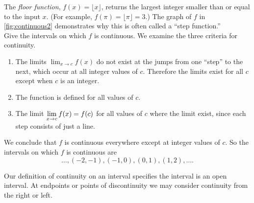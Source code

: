 
\begin{example}\label{ex_contint2}%
The \emph{floor function},
$f(x) = \lfloor x \rfloor$, returns the largest integer smaller than or equal to the input $x$. (For example, $f(\pi) = \lfloor \pi \rfloor = 3$.) The graph of $f$ in \autoref{fig:continuous2} demonstrates why this is often called a ``step function.'' \\
Give the intervals on which $f$ is continuous.
\solution
We examine the three criteria for continuity.
\begin{enumerate}
	\item	The limits $\lim_{x\to c} f(x)$ do not exist at the jumps from one ``step'' to the next, which occur at all integer values of $c$. Therefore the limits exist for all $c$ except when $c$ is an integer.
	\item	The function is defined for all values of $c$.
	\item	The limit $\displaystyle \lim_{x\to c} f(x) = f(c)$ for all values of $c$ where the limit exist, since each step consists of just a line. 
\end{enumerate}
We conclude that $f$ is continuous everywhere except at integer values of $c$. So the intervals on which $f$ is continuous are
\[\dotsc, (-2,-1), (-1,0), (0,1), (1,2), \dotsc.\]
\end{example}

Our definition of continuity on an interval specifies the interval is an open interval. At endpoints or points of discontinuity we may consider continuity from the right or left.

